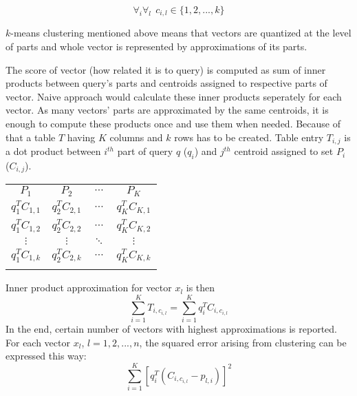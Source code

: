 \begin{equation*}
\forall_i \forall_l\ \  c_{i,l} \in \{1,2,...,k\}
\end{equation*}

$k$-means clustering mentioned above means that vectors are quantized at the level of parts
and whole vector is represented by approximations of its parts.
\par
The score of vector (how related it is to query) is computed as sum of inner products
between query's parts and centroids assigned to respective parts of vector.
Naive approach would calculate these inner products seperately for each vector.
As many vectors' parts are approximated by the same centroids, it is enough to compute
these products once and use them when needed.
Because of that a table $T$ having $K$ columns and $k$ rows has to be created.
Table entry $T_{i,j}$ is a dot product between $i^{th}$ part of query $q$ ($q_i$) and $j^{th}$
centroid assigned to set $P_i$ ($C_{i,j}$).

\renewcommand{\arraystretch}{1.6}
\begin{center}
\begin{tabular}{|c|c|c|c|}
\multicolumn{1}{c}{$P_{1}$} & \multicolumn{1}{c}{$P_{2}$}
& \multicolumn{1}{c}{$\cdots$} & \multicolumn{1}{c}{$P_{K}$} \\
\hhline{----}
$ q_1^T C_{1,1} $ & $ q_2^T C_{2,1} $ & $ \cdots $ & $ q_K^T C_{K,1} $\\
\hhline{----}
$ q_1^T C_{1,2} $ & $ q_2^T C_{2,2} $ & $ \cdots $ & $ q_K^T C_{K,2} $\\
\hhline{----}
$ \vdots $ & $ \vdots $ & $ \ddots $ & $ \vdots $\\
\hhline{----}
$ q_1^T C_{1,k} $ & $ q_2^T C_{2,k} $ & $ \cdots $ & $ q_K^T C_{K,k} $\\
\hhline{----}
\end{tabular}
\end{center}

Inner product approximation for vector $x_l$ is then
$$\sum_{i=1}^{K} T_{i,c_{i,l}} = \sum_{i=1}^{K} q_i^T C_{i,c_{i,l}}$$
In the end, certain number of vectors with highest approximations is reported.
For each vector $x_l$, $l = 1,2,...,n$, the squared error arising from clustering can be expressed this way:
$$ \sum_{i=1}^{K}  [q_{i}^{T} (C_{i, c_{i,l}} - p_{l,i})]^2$$
